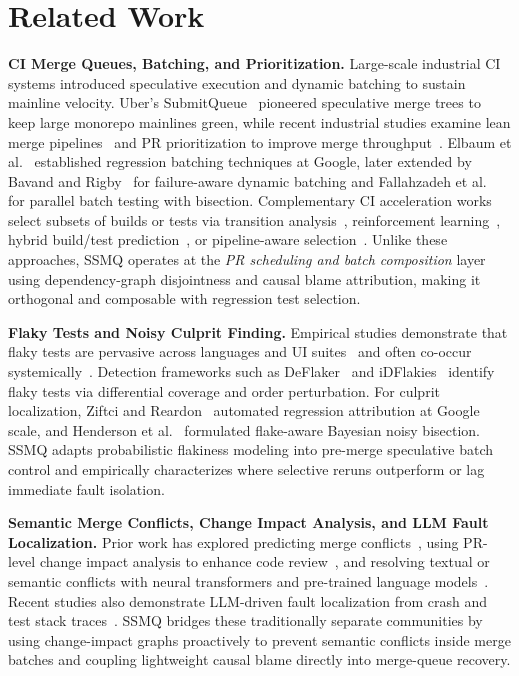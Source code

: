 \section{Related Work}
\label{sec:related}

\textbf{CI Merge Queues, Batching, and Prioritization.}
Large-scale industrial CI systems introduced speculative execution and dynamic batching to sustain mainline velocity. Uber's SubmitQueue~\cite{ananthanarayanan2019keeping} pioneered speculative merge trees to keep large monorepo mainlines green, while recent industrial studies examine lean merge pipelines~\cite{juloori2025scale} and PR prioritization to improve merge throughput~\cite{jungwirth2025improving}. Elbaum et al.~\cite{elbaum2014techniques} established regression batching techniques at Google, later extended by Bavand and Rigby~\cite{bavand2021mining} for failure-aware dynamic batching and Fallahzadeh et al.~\cite{fallahzadeh2023accelerating} for parallel batch testing with bisection. Complementary CI acceleration works select subsets of builds or tests via transition analysis~\cite{leong2019assessing}, reinforcement learning~\cite{spieker2017reinforcement}, hybrid build/test prediction~\cite{jin2023hybridcisave}, or pipeline-aware selection~\cite{schwendner2025practical}. Unlike these approaches, SSMQ operates at the \emph{PR scheduling and batch composition} layer using dependency-graph disjointness and causal blame attribution, making it orthogonal and composable with regression test selection.

\textbf{Flaky Tests and Noisy Culprit Finding.}
Empirical studies demonstrate that flaky tests are pervasive across languages and UI suites~\cite{luo2014empirical,lam2020large,romano2021empirical,tahir2023test} and often co-occur systemically~\cite{parry2025systemic}. Detection frameworks such as DeFlaker~\cite{bell2018laker} and iDFlakies~\cite{lam2019idflakies} identify flaky tests via differential coverage and order perturbation. For culprit localization, Ziftci and Reardon~\cite{ziftci2017broke} automated regression attribution at Google scale, and Henderson et al.~\cite{henderson2023flake} formulated flake-aware Bayesian noisy bisection. SSMQ adapts probabilistic flakiness modeling into pre-merge speculative batch control and empirically characterizes where selective reruns outperform or lag immediate fault isolation.

\textbf{Semantic Merge Conflicts, Change Impact Analysis, and LLM Fault Localization.}
Prior work has explored predicting merge conflicts~\cite{owhadikareshk2019predicting}, using PR-level change impact analysis to enhance code review~\cite{gmen2025enhanced}, and resolving textual or semantic conflicts with neural transformers and pre-trained language models~\cite{zhang2022trained,svyatkovskiy2022program}. Recent studies also demonstrate LLM-driven fault localization from crash and test stack traces~\cite{jambigi2025fault}. SSMQ bridges these traditionally separate communities by using change-impact graphs proactively to prevent semantic conflicts inside merge batches and coupling lightweight causal blame directly into merge-queue recovery.
